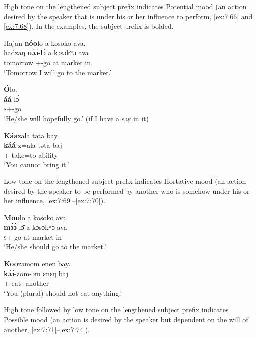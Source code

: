 High tone on the lengthened subject prefix indicates Potential mood (an action desired by the speaker that is under his or her influence to perform, \ref{ex:7:66} and \ref{ex:7:68}). In the examples, the subject prefix is bolded.

\noindent\parbox{\textwidth}{\ea\label{ex:7:66}
Hajan  \textbf{nóo}lo a  kosoko  ava.\\
\gll  hadzaŋ  \textbf{n\'ɔ\'ɔ}{}-l\'ɔ    a  kɔsɔkʷɔ  ava\\
      tomorrow  {\oneS}+{\POT}-go  at  market  in\\
\glt  ‘Tomorrow I will go to the market.’\\
\z}

\ea\label{ex:7:67}
\textbf{Ó}lo.\\
\gll  \textbf{áá}-l\'ɔ\\
      \textsc{s}+{\POT}-go\\
\glt  ‘He/she will hopefully go.’ (if I have a say in it)\\
\z 

\ea\label{ex:7:68}
\textbf{Káa}zala  təta  bay.\\
\gll  \textbf{káá}{}-z=ala  təta    baj\\
      {\twoS}+{\POT}-take=to  ability  {\NEG}\\
\glt  ‘You cannot bring it.’\\
\z 

Low tone on the lengthened subject prefix indicates Hortative mood (an action desired by the speaker to be performed by another who is somehow under his or her influence, \ref{ex:7:69}--\ref{ex:7:70}).

\ea\label{ex:7:69}
\textbf{Moo}lo  a  kosoko  ava.\\
\gll  \textbf{m\`ɔ\`ɔ}{}-l\=ɔ    a  kɔsɔkʷɔ  ava\\
      \textsc{s}+{\HOR}-go    at  market  in\\
\glt  ‘He/she should go to the market.’\\
\z 

\ea\label{ex:7:70}
\textbf{Koo}zəmom  enen  bay.\\
\gll  \textbf{k\`ɔ\`ɔ}{}-z\=ʊm-ɔm    ɛnɛŋ  baj\\
      {\twoP}+{\HOR}-eat-{\twoP}  another  {\NEG}\\
\glt  ‘You (plural) should not eat anything.’\\
\z 

High tone followed by low tone on the lengthened subject prefix indicates Possible mood (an action is desired by the speaker but dependent on the will of another, \ref{ex:7:71}--\ref{ex:7:74}).

